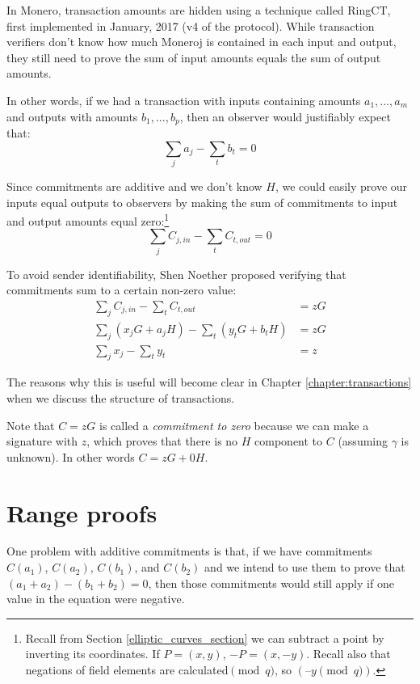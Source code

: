 In Monero, transaction amounts are hidden using a technique called RingCT, first implemented in January, 2017 (v4 of the protocol). While transaction verifiers don’t know how much Moneroj is contained in each input and output, they still need to prove the sum of input amounts equals the sum of output amounts. 

In other words, if we had a transaction with inputs containing amounts \(a_1, ..., a_m\) and outputs with amounts \(b_1, ..., b_p\), then an observer would justifiably expect that: \\
\[\sum_j a_j - \sum_t b_t = 0\]

Since commitments are additive and we don't know $H$, we could easily prove our inputs equal outputs to observers by making the sum of commitments to input and output amounts equal zero:\footnote{Recall from Section \ref{elliptic_curves_section} we can subtract a point by inverting its coordinates. If $P = (x, y)$, $-P = (x, -y)$. Recall also that negations of field elements are calculated$\pmod q$, so $(–y \pmod q)$.}
\[\sum_{j}{C_{j, in}}     - \sum_{t}{C_{t, out}} = 0\]

To avoid sender identifiability, Shen Noether proposed \cite{cryptoeprint:2015:1098} verifying that commitments sum to a certain non-zero value:\\
\begin{align*}
\sum_{j}{C_{j, in}}     - \sum_{t}{C_{t, out}} &= z G \\
\sum_{j}{(x_j G + a_j H)}  - \sum_{t}{(y_t G + b_t H)} &= z G \\
\sum_{j} x_j - \sum_{t} y_t &= z
\end{align*}

The reasons why this is useful will become clear in Chapter \ref{chapter:transactions} when we discuss the structure of transactions.

Note that $C = z G$ is called a {\em commitment to zero} because we can make a signature with $z$, which proves that there is no $H$ component to $C$ (assuming $\gamma$ is unknown). In other words $C = z G + 0 H$.



\section{Range proofs}
\label{sec:range_proofs}

One problem with additive commitments is that, if we have commitments $C(a_1)$, $C(a_2)$, $C(b_1)$, and $C(b_2)$ and we intend to use them to prove that $(a_1 + a_2) - (b_1 + b_2) = 0$, then those commitments would still apply if one value in the equation were negative.

